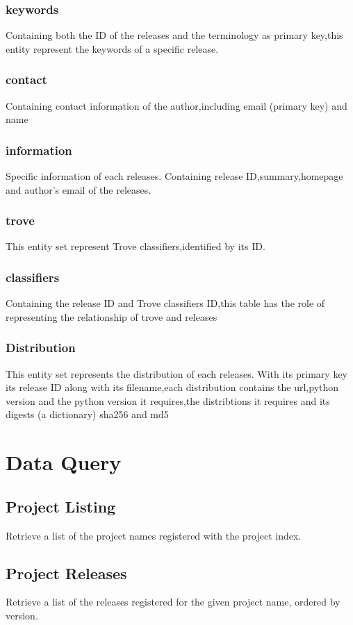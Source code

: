 \documentclass[a4paper,12pt]{article}
\begin{document}
\subsubsection{keywords}
Containing both the ID of the releases and the terminology  as primary key,this entity represent the keywords of a specific release.
\subsubsection{contact}
Containing contact information of the author,including email (primary key) and name
\subsubsection{information}
Specific information of each releases. Containing release ID,summary,homepage and author's email of the releases.
\subsubsection{trove}
This entity set represent Trove classifiers,identified by its ID.
\subsubsection{classifiers}
Containing the release ID and Trove classifiers ID,this table has the role of representing the relationship of trove and releases
\subsubsection{Distribution}
This entity set represents the distribution of each releases. With its primary key its release ID along with its filename,each distribution contains the url,python version and the python version it requires,the distribtions it requires and its digests (a dictionary) sha256 and md5


\newpage
\section{Data Query}
\subsection{Project Listing}
Retrieve a list of the project names registered with the project index.
\subsection{Project Releases}
Retrieve a list of the releases registered for the given project name, ordered by version.
\end{document}

